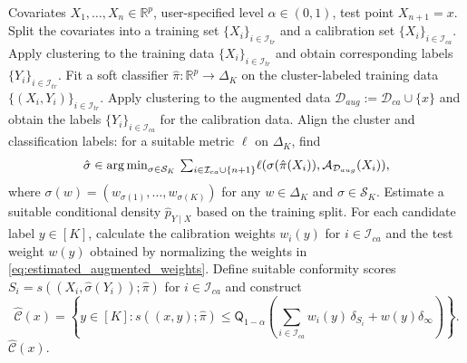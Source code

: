 \documentclass[11pt,letterpaper]{article}
\theoremstyle{definition}
\newcommand{\cA}{\mathcal{A}}
\newcommand{\cC}{\mathcal{C}}
\newcommand{\cD}{\mathcal{D}}
\newcommand{\cI}{\mathcal{I}}
\newcommand{\cS}{\mathcal{S}}
\newcommand{\R}{\mathbb{R}}
\DeclareMathOperator*{\argmin}{arg\,min} %
\begin{document}
\setcounter{algorithm}{0} %
\renewcommand{\thealgorithm}{\arabic{algorithm}} %
\begin{algorithm}[!htbp]
    \caption{Weighted Conformal Clustering (Augmented)}
    \label{alg:estimated_weighted_conformal_clustering}
    \begin{algorithmic}[1]
        \REQUIRE Covariates \(X_1, \ldots, X_n \in \R^p\), user-specified level \(\alpha \in (0, 1)\), test point $X_{n+1} = x$.
        \STATE Split the covariates into a training set \(\{X_i\}_{i \in \cI_{tr}}\) and a calibration set \(\{X_i\}_{i \in \cI_{ca}}\).
        \STATE Apply clustering to the training data \(\{X_i\}_{i \in \cI_{tr}}\) and obtain corresponding labels \(\{Y_i\}_{i \in \cI_{tr}}\).
        \STATE Fit a soft classifier \(\hat{\pi} \colon \R^p \to \Delta_K\) on the cluster-labeled training data \(\{(X_i, Y_i)\}_{i \in \cI_{tr}}\).
        \STATE Apply clustering to the augmented data \(\cD_{aug} := \cD_{ca} \cup \{x\}\) and obtain the labels $\{Y_i\}_{i \in \cI_{ca}}$ for the calibration data.
        \STATE Align the cluster and classification labels: for a suitable metric $\ell$ on $\Delta_K$, find 
        \begin{equation*}
            \hat{\sigma} \in {\textstyle\argmin_{\sigma \in \cS_K}} ~ {\textstyle \sum_{i \in \cI_{ca} \cup \{n + 1\}}} \ell(\sigma(\hat{\pi}(X_i)), \cA_{\cD_{aug}}(X_i)), \vspace*{-4pt}
        \end{equation*}
        where $\sigma(w) = (w_{\sigma(1)}, \ldots, w_{\sigma(K)})$ for any $w \in \Delta_K$ and $\sigma \in \cS_K$.
        \STATE Estimate a suitable conditional density $\hat p_{Y\mid X}$ based on the training split.
        \STATE For each candidate label \(y \in [K]\), calculate the calibration weights $w_i(y)$ for $i\in \cI_{ca}$ and the test weight $w(y)$ obtained by normalizing the weights in \eqref{eq:estimated_augmented_weights}.
        \STATE Define suitable conformity scores $S_i = s((X_i, \hat{\sigma}(Y_i)); \hat{\pi})$ for $i \in \cI_{ca}$ and construct
        \begin{equation*}
            \hat{\cC}(x) = \left\{y \in [K]: s((x, y); \hat{\pi}) \le \mathsf{Q}_{1 - \alpha}\left({\textstyle\sum_{i \in \cI_{ca}}} w_i(y) \, \delta_{S_i} + w(y) \delta_{\infty}\right)\right\}.
        \end{equation*}
        \vspace*{-10pt}
        \RETURN \(\hat{\cC}(x)\).
    \end{algorithmic}
\end{algorithm}
\end{document}
